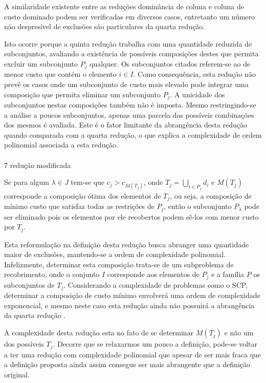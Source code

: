 \documentclass[a4paper,10pt]{article}
\begin{document}
A similaridade existente entre as reduções dominância de coluna e coluna de custo dominado podem ser verificadas em diversos casos, entretanto um número não despresível de exclusões são particulares da quarta redução.

Isto ocorre porque a quinta redução trabalha com uma quantidade reduzida de subconjuntos, avaliando a existência de possíveis composições destes que permita excluir um subconjunto $P_{j}$ qualquer. Os subconjuntos citados referem-se ao de menor custo que contém o elemento $i \in I$. Como consequência, esta redução não prevê os casos onde um subconjunto de custo mais elevado pode integrar uma composição que permita eliminar um subconjunto $P_{j}$. A unicidade dos subconjuntos nestas composições também não é imposta. Mesmo restringindo-se a análise a poucos subconjuntos, apenas uma parcela das possíveis combinações dos mesmos é avaliada. Este é o fator limitante da abrangência desta redução quando comparada com a quarta redução, o que explica a complexidade de ordem polinomial associada a esta redução.

\paragraph{}
7 redução modificada

Se para algum $ \lambda \in J$ tem-se que $c_{j} > c_{M(T_{j}) }$, onde $T_{j} = \bigcup _{i \in P_{j} } d_{i}$ e $M(T _{j} )$ corresponde a composição ótima dos elementos de $T_{j}$, ou seja, a composição de mínimo custo que satisfaz todas as restrições de $P_{j}$, então o subconjunto $P_{ \lambda }$ pode ser eliminado pois os elementos por ele recobertos podem sê-los com menor custo por $T_{j}$.

Esta reformulação na definição desta redução busca abranger uma quantidade maior de exclusões, mantendo-se a ordem de complexidade polinomial. Infelizmente, determinar esta composição trata-se de um subproblema de recobrimento, onde o conjunto $I$ corresponde aos elementos de $P_{j}$ e a família $P$ os subconjuntos de $T_{j}$. Considerando a complexidade de problemas como o SCP, determinar a composição de custo mínimo envolverá uma ordem de complexidade exponencial, e mesmo neste caso esta redução ainda não possuirá a abrangência da quarta redução
.

A complexidade desta redução esta no fato de se determinar $M(T_{j})$ e não um dos possíveis $T_{j}$. Decorre que se relaxarmos um pouco a definição, pode-se voltar a ter uma redução com complexidade polinomial que apesar de ser mais fraca que a definição proposta ainda assim consegue ser mais abrangente que a definição original.
\end{document}
